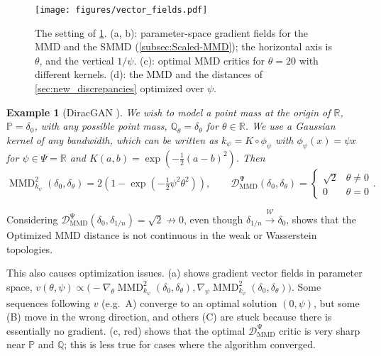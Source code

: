\documentclass{article}
\newcommand{\wassconv}[1][]{\xrightarrow{{\mathcal W}_{#1}}}
\newcommand{\R}{\mathbb R}
\newcommand{\PP}{\mathbb P}
\newcommand{\QQ}{\mathbb Q}
\DeclareMathOperator{\MMD}{MMD}
\newcommand{\optMMD}[1][\Psi]{\operatorname{\mathcal D_{\mathrm{MMD}}^{#1}}}
\let\citep\parencite
\newtheorem{example}{Example}
\begin{document}
\begin{figure}[t]
\centering
        \texttt{[image: figures/vector\_fields.pdf]}
        \caption{The setting of \cref{example:diracgan}.
(a, b): parameter-space gradient fields for the MMD and the SMMD (\cref{subsec:Scaled-MMD}); the horizontal axis is $\theta$, and the vertical $1/\psi$.
         (c): optimal MMD critics for $\theta = 20$ with different kernels.
         (d): the MMD and the distances of \cref{sec:new_discrepancies} optimized over $\psi$.}
       \label{fig:mmd_vector_fields}
\end{figure}
\begin{example}[DiracGAN \citep{Mescheder:2018}] \label{example:diracgan}
We wish to model a point mass at the origin of $\R$,
$\PP = \delta_0$,
with any possible point mass, $\QQ_\theta = \delta_\theta$ for $\theta \in \R$.
We use a Gaussian kernel of any bandwidth,
which can be written as $k_\psi = K \circ \phi_\psi$
with $\phi_\psi(x) = \psi x$ for $\psi \in \Psi = \R$
and
$K(a, b) = \exp\left( -\frac12 (a-b)^2 \right)$.
Then
\begin{equation*}
  \MMD_{k_{\psi}}^{2}(\delta_{0}, \delta_{\theta}) = 2 \left( 1 - \exp\left(-\tfrac12 \psi^2 \theta^2 \right) \right),
  \qquad
  \optMMD(\delta_0, \delta_\theta) = \begin{cases} \sqrt{2} & \theta \ne 0 \\ 0 & \theta = 0 \end{cases}
.\end{equation*}
\end{example}
Considering $\optMMD(\delta_0, \delta_{1/n}) = \sqrt 2 \not\to 0$,
even though $\delta_{1/n} \wassconv \delta_0$,
shows that the Optimized MMD
distance is not continuous in the weak or Wasserstein topologies.

This also causes optimization issues.
 (a) shows gradient vector fields in parameter space,
$
  v(\theta, \psi) \propto \big(
    -\nabla_\theta \MMD_{k_\psi}^2(\delta_0, \delta_\theta),
     \nabla_\psi   \MMD_{k_\psi}^2(\delta_0, \delta_\theta)
  \big)
$.
Some sequences following $v$ (e.g.\ A) converge to an optimal solution $(0, \psi)$, but some (B) move in the wrong direction,
and others (C) are stuck because there is essentially no gradient.
 (c, red) shows that the optimal $\optMMD$ critic is very sharp near $\PP$ and $\QQ$;
this is less true for cases where the algorithm converged.
\end{document}
